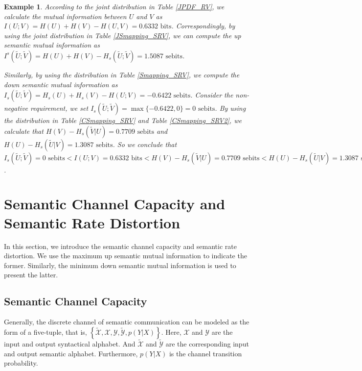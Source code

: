 \documentclass[12pt, draftclsnofoot,onecolumn]{IEEEtran}
\newtheorem{example}{\bf{Example}}
\begin{document}
\begin{example}
According to the joint distribution in Table \ref{JPDF_RV}, we calculate the mutual information between $U$ and $V$ as $I(U;V)=H(U)+H(V)-H(U,V)=0.6332 \text{ bits}$. Correspondingly, by using the joint distribution in Table \ref{JSmapping_SRV}, we can compute the up semantic mutual information as $I^s(\tilde{U};\tilde{V})=H(U)+H(V)-H_s(\tilde{U};\tilde{V})=1.5087 \text{ sebits}$.

Similarly, by using the distribution in Table \ref{Smapping_SRV}, we compute the down semantic mutual information as $I_s(\tilde{U};\tilde{V})=H_s(U)+H_s(V)-H(U;V)=-0.6422 \text{ sebits}$. Consider the non-negative requirement, we set $I_s(\tilde{U};\tilde{V})=\max\{-0.6422,0\}=0 \text{ sebits}$. By using the distribution in Table \ref{CSmapping_SRV} and Table \ref{CSmapping_SRV2}, we calculate that $H(V)-H_s(\tilde{V}\left|U\right.)=0.7709 \text{ sebits}$ and $H(U)-H_s(\tilde{U}\left|V\right.)=1.3087 \text{ sebits}$. So we conclude that $I_s(\tilde{U};\tilde{V})=0 \text{ sebits}<I(U;V)=0.6332 \text{ bits}<H(V)-H_s(\tilde{V}\left|U\right.)=0.7709 \text{ sebits}<H(U)-H_s(\tilde{U}\left|V\right.)=1.3087 \text{ sebits}<I^s(\tilde{U};\tilde{V})=1.5087 \text{ sebits}$.
\end{example}

\section{Semantic Channel Capacity and Semantic Rate Distortion}
\label{section_V}
In this section, we introduce the semantic channel capacity and semantic rate distortion. We use the maximum up semantic mutual information to indicate the former. Similarly, the minimum down semantic mutual information is used to present the latter.
\subsection{Semantic Channel Capacity}
Generally, the discrete channel of semantic communication can be modeled as the form of a five-tuple, that is, $\left\{\tilde{\mathcal{X}},\mathcal{X},\mathcal{Y},\tilde{\mathcal{Y}}, p(Y|X)\right\}$. Here, $\mathcal{X}$ and $\mathcal{Y}$ are the input and output syntactical alphabet. And $\tilde{\mathcal{X}}$ and $\tilde{\mathcal{Y}}$ are the corresponding input and output semantic alphabet. Furthermore, $p(Y|X)$ is the channel transition probability.
\end{document}
